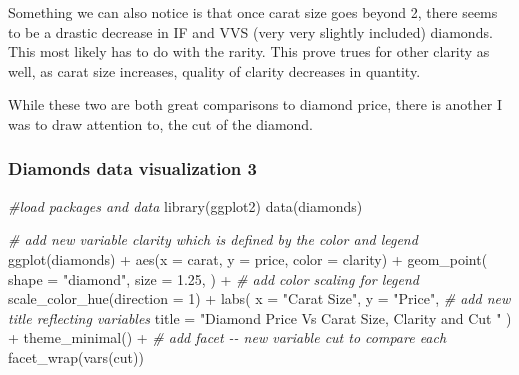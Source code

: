 \documentclass[
]{article}
\newenvironment{Shaded}{\begin{snugshade}}{\end{snugshade}}
\newcommand{\AttributeTok}[1]{\textcolor[rgb]{0.77,0.63,0.00}{#1}}
\newcommand{\CommentTok}[1]{\textcolor[rgb]{0.56,0.35,0.01}{\textit{#1}}}
\newcommand{\DecValTok}[1]{\textcolor[rgb]{0.00,0.00,0.81}{#1}}
\newcommand{\FloatTok}[1]{\textcolor[rgb]{0.00,0.00,0.81}{#1}}
\newcommand{\FunctionTok}[1]{\textcolor[rgb]{0.00,0.00,0.00}{#1}}
\newcommand{\NormalTok}[1]{#1}
\newcommand{\SpecialCharTok}[1]{\textcolor[rgb]{0.00,0.00,0.00}{#1}}
\newcommand{\StringTok}[1]{\textcolor[rgb]{0.31,0.60,0.02}{#1}}
\begin{document}
Something we can also notice is that once carat size goes beyond 2,
there seems to be a drastic decrease in IF and VVS (very very slightly
included) diamonds. This most likely has to do with the rarity. This
prove trues for other clarity as well, as carat size increases, quality
of clarity decreases in quantity.

While these two are both great comparisons to diamond price, there is
another I was to draw attention to, the cut of the diamond.

\hypertarget{diamonds-data-visualization-3}{%
\subsubsection{Diamonds data visualization
3}\label{diamonds-data-visualization-3}}

\begin{Shaded}
\begin{Highlighting}[]
\CommentTok{\#load packages and data}
\FunctionTok{library}\NormalTok{(ggplot2)}
\FunctionTok{data}\NormalTok{(diamonds)}

\CommentTok{\# add new variable \textquotesingle{}clarity\textquotesingle{} which is defined by the color and legend}
\FunctionTok{ggplot}\NormalTok{(diamonds) }\SpecialCharTok{+}
  \FunctionTok{aes}\NormalTok{(}\AttributeTok{x =}\NormalTok{ carat, }\AttributeTok{y =}\NormalTok{ price, }\AttributeTok{color =}\NormalTok{ clarity) }\SpecialCharTok{+}
  \FunctionTok{geom\_point}\NormalTok{(}
    \AttributeTok{shape =} \StringTok{"diamond"}\NormalTok{,}
    \AttributeTok{size =} \FloatTok{1.25}\NormalTok{,}
\NormalTok{  ) }\SpecialCharTok{+} 
  \CommentTok{\# add color scaling for legend }
  \FunctionTok{scale\_color\_hue}\NormalTok{(}\AttributeTok{direction =} \DecValTok{1}\NormalTok{) }\SpecialCharTok{+}
  \FunctionTok{labs}\NormalTok{(}
    \AttributeTok{x =} \StringTok{"Carat Size"}\NormalTok{,}
    \AttributeTok{y =} \StringTok{"Price"}\NormalTok{,}
    \CommentTok{\# add new title reflecting variables }
    \AttributeTok{title =} \StringTok{"Diamond Price Vs Carat Size, Clarity and Cut "}
\NormalTok{  ) }\SpecialCharTok{+}
  \FunctionTok{theme\_minimal}\NormalTok{() }\SpecialCharTok{+}
  \CommentTok{\# add facet {-}{-} new variable cut to compare each }
  \FunctionTok{facet\_wrap}\NormalTok{(}\FunctionTok{vars}\NormalTok{(cut))}
\end{Highlighting}
\end{Shaded}
\end{document}

